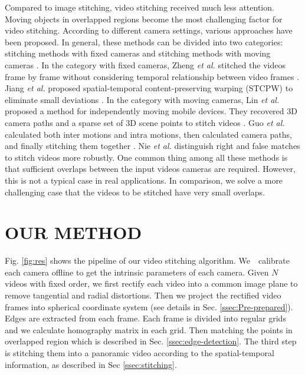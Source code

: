 \documentclass[conference]{IEEEtran}
\begin{document}
 Compared to image stitching, video stitching received much less attention. 
Moving objects in overlapped regions become the most challenging factor for video stitching.
%
According to different camera settings, various approaches have been proposed. In general, these methods can be divided into two categories: 
stitching methods with fixed cameras \cite{zheng2008stitching, he2010panoramic, Jiang_2015_CVPR_Workshops, perazzi2015panoramic, li2015efficient} 
and stitching methods with moving cameras \cite{lin2016seamless, guo2016joint, nie2018dynamic}. 
%
In the category with fixed cameras, Zheng \textit{et al.} stitched the videos frame by frame without considering temporal relationship between video frames \cite{zheng2008stitching}.
Jiang \textit{et al.} proposed spatial-temporal content-preserving warping (STCPW) to eliminate small deviations \cite{Jiang_2015_CVPR_Workshops}.
In the category with moving cameras, 
Lin \textit{et al.} proposed a method for independently moving mobile devices.
They recovered 3D camera paths and a sparse set of 3D scene points to stitch videos \cite{lin2016seamless}.
Guo \textit{et al.} calculated both inter
motions and intra motions, then calculated camera paths, and finally stitching them together \cite{guo2016joint}.
Nie \textit{et al.} distinguish right and false matches \cite{nie2018dynamic} to stitch videos more robustly. 
One common thing among all these methods is that sufficient overlaps between the input videos cameras are required. 
However, this is not a typical case in real applications. 
In comparison, we solve a more challenging case that the videos to be stitched have very small overlaps.

\section{OUR METHOD}
\label{sec:ourmethod}

Fig. \ref{fig:res} shows the pipeline of our video stitching algorithm.
We　calibrate each camera offline to get the intrinsic parameters of each camera. 
Given $N$ videos with fixed order, we first rectify each video into a common image plane to remove tangential and radial distortions.
Then we project the rectified video frames into spherical coordinate system (see details in Sec. \ref{ssec:Pre-prepared}). 
Edges are extracted from each frame.
Each frame is divided into regular grids and we calculate homography matrix in each grid. 
Then matching the points in overlapped region which is described in Sec. \ref{ssec:edge-detection}. 
The third step is stitching them into a panoramic video according to the spatial-temporal information, as described in Sec \ref{ssec:stitching}.
\end{document}
